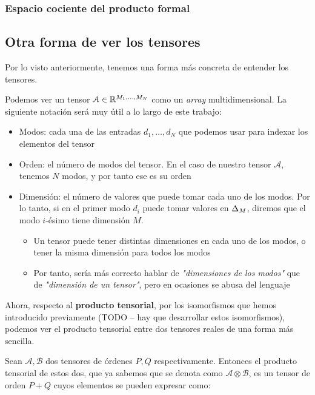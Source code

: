 \subsubsection{Espacio cociente del producto formal}

\subsection{Otra forma de ver los tensores}

Por lo visto anteriormente, tenemos una forma más concreta de entender los tensores.

Podemos ver un tensor $\mathcal{A} \in \mathbb{R}^{M_1, \ldots, M_N}$ como un \textit{array} multidimensional. La siguiente notación será muy útil a lo largo de este trabajo:

\begin{itemize}
    \item Modos: cada una de las entradas $d_1, \ldots, d_N$ que podemos usar para indexar los elementos del tensor
    \item Orden: el número de modos del tensor. En el caso de nuestro tensor $\mathcal{A}$, tenemos $N$ modos, y por tanto ese es su orden
    \item Dimensión: el número de valores que puede tomar cada uno de los modos. Por lo tanto, si en el primer modo $d_i$ puede tomar valores en $\Delta_{M}$, diremos que el modo $i$-ésimo tiene dimensión $M$.
        \begin{itemize}
            \item Un tensor puede tener distintas dimensiones en cada uno de los modos, o tener la misma dimensión para todos los modos
            \item Por tanto, sería más correcto hablar de \textit{"dimensiones de los modos"} que de \textit{"dimensión de un tensor"}, pero en ocasiones se abusa del lenguaje
        \end{itemize}
\end{itemize}

Ahora, respecto al \textbf{producto tensorial}, por los isomorfismos que hemos introducido previamente (TODO -- hay que desarrollar estos isomorfismos), podemos ver el producto tensorial entre dos tensores reales de una forma más sencilla.

Sean $\mathcal{A}, \mathcal{B}$ dos tensores de órdenes $P, Q$ respectivamente. Entonces el producto tensorial de estos dos, que ya sabemos que se denota como $\mathcal{A} \otimes \mathcal{B}$, es un tensor de orden $P + Q$ cuyos elementos se pueden expresar como:

